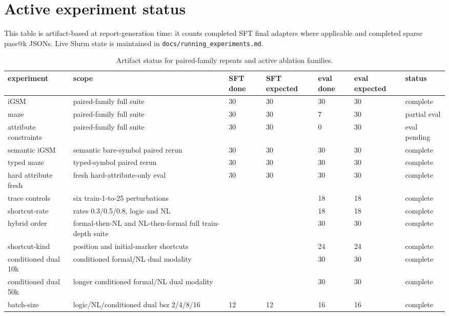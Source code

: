\documentclass[10pt]{article}
\begin{document}
\section{Active experiment status}
This table is artifact-based at report-generation time: it counts completed SFT final adapters where applicable and completed sparse pass@k JSONs. Live Slurm state is maintained in \texttt{docs/running\_experiments.md}.

\begin{table}[H]
\centering
\scriptsize
\begin{tabular}{lllllll}
\toprule
experiment & scope & SFT done & SFT expected & eval done & eval expected & status \\
\midrule
iGSM & paired-family full suite & 30 & 30 & 30 & 30 & complete \\
maze & paired-family full suite & 30 & 30 & 7 & 30 & partial eval \\
attribute constraints & paired-family full suite & 30 & 30 & 0 & 30 & eval pending \\
semantic iGSM & semantic bare-symbol paired rerun & 30 & 30 & 30 & 30 & complete \\
typed maze & typed-symbol paired rerun & 30 & 30 & 30 & 30 & complete \\
hard attribute fresh & fresh hard-attribute-only eval & 30 & 30 & 30 & 30 & complete \\
trace controls & six train-1-to-25 perturbations &  &  & 18 & 18 & complete \\
shortcut-rate & rates 0.3/0.5/0.8, logic and NL &  &  & 18 & 18 & complete \\
hybrid order & formal-then-NL and NL-then-formal full train-depth suite &  &  & 30 & 30 & complete \\
shortcut-kind & position and initial-marker shortcuts &  &  & 24 & 24 & complete \\
conditioned dual 10k & conditioned formal/NL dual modality &  &  & 30 & 30 & complete \\
conditioned dual 50k & longer conditioned formal/NL dual modality &  &  & 30 & 30 & complete \\
batch-size & logic/NL/conditioned dual bsz 2/4/8/16 & 12 & 12 & 16 & 16 & complete \\
\bottomrule
\end{tabular}
\caption{Artifact status for paired-family repeats and active ablation families.}
\end{table}
\end{document}
